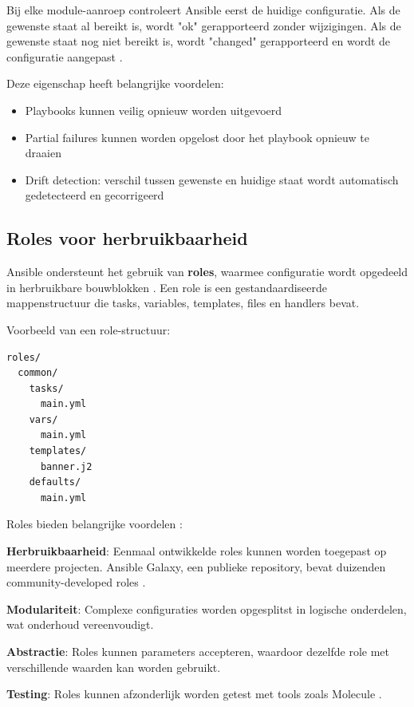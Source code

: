 Bij elke module-aanroep controleert Ansible eerst de huidige configuratie. 
Als de gewenste staat al bereikt is, wordt "ok" gerapporteerd zonder wijzigingen. 
Als de gewenste staat nog niet bereikt is, wordt "changed" gerapporteerd en wordt de configuratie aangepast \autocite{Hochstein2017AnsibleUpRunning}.

Deze eigenschap heeft belangrijke voordelen:
\begin{itemize}
  \item Playbooks kunnen veilig opnieuw worden uitgevoerd
  \item Partial failures kunnen worden opgelost door het playbook opnieuw te draaien
  \item Drift detection: verschil tussen gewenste en huidige staat wordt automatisch gedetecteerd en gecorrigeerd
\end{itemize}

\subsection{Roles voor herbruikbaarheid}
\label{subsec:ansible-roles}

Ansible ondersteunt het gebruik van \textbf{roles}, waarmee configuratie wordt opgedeeld in herbruikbare bouwblokken \autocite{RedHat2024AnsibleDocs}. 
Een role is een gestandaardiseerde mappenstructuur die tasks, variables, templates, files en handlers bevat.

Voorbeeld van een role-structuur:

\begin{verbatim}
roles/
  common/
    tasks/
      main.yml
    vars/
      main.yml
    templates/
      banner.j2
    defaults/
      main.yml
\end{verbatim}

Roles bieden belangrijke voordelen \autocite{Geerling2020AnsibleDevOps}:

\textbf{Herbruikbaarheid}: Eenmaal ontwikkelde roles kunnen worden toegepast op meerdere projecten.
Ansible Galaxy, een publieke repository, bevat duizenden community-developed roles \autocite{AnsibleGalaxy2024}.

\textbf{Modulariteit}: Complexe configuraties worden opgesplitst in logische onderdelen, wat onderhoud vereenvoudigt.

\textbf{Abstractie}: Roles kunnen parameters accepteren, waardoor dezelfde role met verschillende waarden kan worden gebruikt.

\textbf{Testing}: Roles kunnen afzonderlijk worden getest met tools zoals Molecule \autocite{Molecule2024Docs}.

